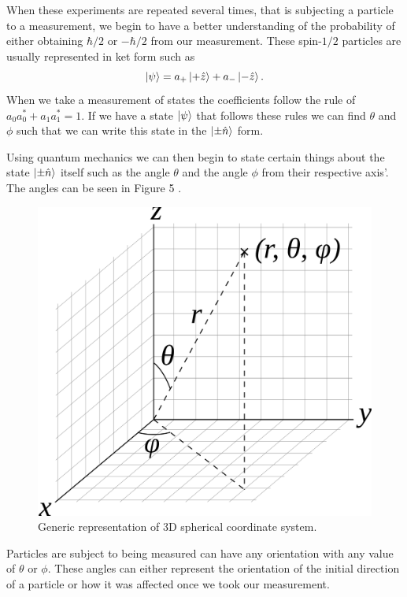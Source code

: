 \documentclass[twocolumn]{article}
\begin{document}
When these experiments are repeated several times, that is subjecting a particle to a measurement, we begin to have a better understanding of the probability of either obtaining $\hbar/2$ or $-\hbar/2$ from our measurement. These spin-$1/2$ particles are usually represented in ket form such as
\begin{equation} \label{eq:5}
\ket{\psi}=a_{+}\ket{+\hat{z}}+a_{-}\ket{-\hat{z}}.
\end{equation}
When we take a measurement of states the coefficients follow the rule of $a_0a_0^*+a_1a_1^*=1$. If we have a state $\ket{\psi}$ that follows these rules we can find $\theta$ and $\phi$ such that we can write this state in the $\ket{\pm\hat{n}}$ form.

Using quantum mechanics we can then begin to state certain things about the state $\ket{\pm\hat{n}}$ itself such as the angle $\theta$ and the angle $\phi$ from their respective axis'. The angles can be seen in Figure 5 \cite{Hazewinkel}.
\begin{figure}[htbp]
\begin{center}
\includegraphics[width=0.75\linewidth]{Spherical-Coordinate-System.png}
\caption{Generic representation of 3D spherical coordinate system.}
\end{center}
\end{figure}
\newline
Particles are subject to being measured can have any orientation with any value of $\theta$ or $\phi$. These angles can either represent the orientation of the initial direction of a particle or how it was affected once we took our measurement. 
\end{document}
